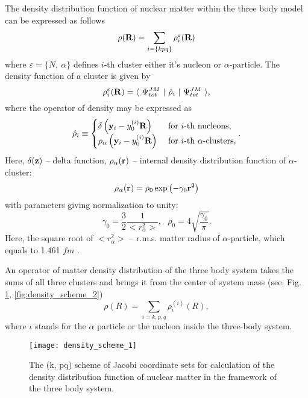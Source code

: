 \documentclass[
12pt, %
oneside, %
english, %
onehalfspacing, %
onehalfspacing, %
headsepline, %
]{MastersDoctoralThesis} %
\begin{document}
The density distribution function of nuclear matter within the three body model can be expressed as follows
\begin{equation}
\rho({\bf R}) = \sum_{i=\{kpq\}} \rho_{i}^{\varepsilon} ({\bf R})
\end{equation}
where $\varepsilon=\{N,~\alpha\}$ defines $i$-th cluster either it's nucleon or $\alpha$-particle.
The density function of a cluster is given by
\begin{equation}
\rho^{\varepsilon}_{i}({\bf R})=
\langle~ \Psi_{tot}^{JM} ~\vert~ \hat{\rho}_i~ \vert~ \Psi_{tot}^{JM} ~\rangle,
\end{equation}
where the operator of density may be expressed as
\begin{equation}
\hat{\rho}_i\equiv
\begin{cases}
\delta \left( {\bf y}_i - y_0^{(i)} {\bf R} \right) 
& ~{\rm for}~ i{\rm \text -th~nucleons} , \\
\rho_{\alpha} \left( {\bf y}_i - y_0^{(i)} {\bf R} \right)  & 
~{\rm for}~ i{\rm \text -th~\alpha\text -clusters},
\end{cases}.
\end{equation}
Here, $\delta({\bf z})$ -- delta function, $\rho_\alpha({\bf r})$ -- internal density distribution function of $\alpha$-cluster:
\begin{equation}
\rho_{\alpha}({\bf r}) = \rho_0 \exp \left( - \gamma_0 {\bf r}^2 \right)
\end{equation}
with parameters giving normalization to unity:
\begin{equation}
\gamma_0=\frac{3}{2} \frac{1}{<r_\alpha^2>},~~~\rho_0=4\sqrt{\frac{\gamma_0}{\pi}}.
\end{equation}
Here,  the square root of $<r_\alpha^2>$ -- r.m.s. matter radius of $\alpha$-particle, which equals to 1.461 $fm$ \cite{satchler1979folding}.


An operator of matter density distribution of the three body system takes the sums of all three clusters and brings it from the center of  system mass (see. Fig. \ref{fig:density_scheme_1}, \ref{fig:density_scheme_2})
\begin{equation}
\rho({R})=\sum_{\scriptscriptstyle{i}=k,p,q} \rho^{(i)}_{{\iota}}({R}),
\label{total_density}
\end{equation}
where $\iota$ stands for the $\alpha$ particle or the nucleon inside the three-body system.

\begin{figure}[b]
\centering
\texttt{[image: density\_scheme\_1]}
\decoRule
\caption{\footnotesize The (k, pq) scheme of Jacobi coordinate sets for calculation of the density distribution function of nuclear matter in the framework of  the three body system.}
\label{fig:density_scheme_1}
\end{figure}
\end{document}
